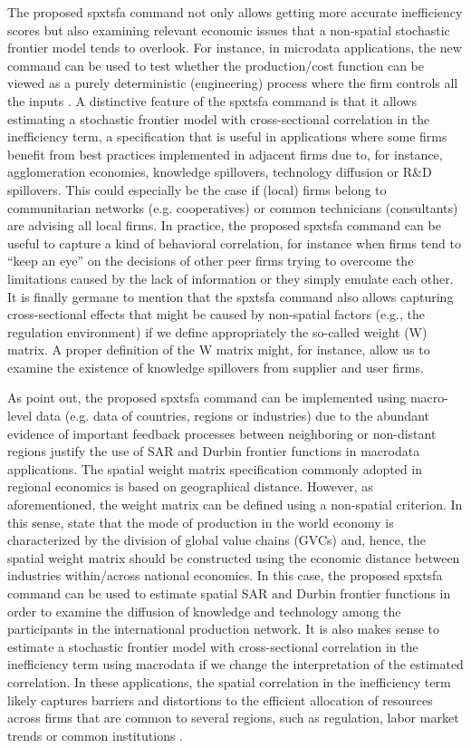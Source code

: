 The proposed spxtsfa command not only allows getting more accurate inefficiency scores \citep[see e.g.][]{orea2018spatial} but also examining relevant economic issues that a non-spatial stochastic frontier model tends to overlook. For instance, in microdata applications, the new command can be used to test whether the production/cost function can be viewed as a purely deterministic (engineering) process where the firm controls all the inputs \citep[see e.g.][]{druska2004generalized}. A distinctive feature of the spxtsfa command is that it allows estimating a stochastic frontier model with cross-sectional correlation in the inefficiency term, a specification that is useful in applications where some firms benefit from best practices implemented in adjacent firms due to, for instance, agglomeration economies, knowledge spillovers, technology diffusion or R\&D spillovers. This could especially be the case if (local) firms belong to communitarian networks (e.g. cooperatives) or common technicians (consultants) are advising all local firms. In practice, the proposed spxtsfa command can be useful to capture a kind of behavioral correlation, for instance when firms tend to “keep an eye” on the decisions of other peer firms trying to overcome the limitations caused by the lack of information or they simply emulate each other. It is finally germane to mention that the spxtsfa command also allows capturing cross-sectional effects that might be caused by non-spatial factors (e.g., the regulation environment) if we define appropriately the so-called weight (W) matrix. A proper definition of the W matrix might, for instance, allow us to examine the existence of knowledge spillovers from supplier and user firms. 

As \cite{orea2019new} point out, the proposed spxtsfa command can be implemented using macro-level data (e.g. data of countries, regions or industries) due to the abundant evidence of important feedback processes between neighboring or non-distant regions justify the use of SAR and Durbin frontier functions in macrodata applications. The spatial weight matrix specification commonly adopted in regional economics is based on geographical distance. However, as aforementioned, the weight matrix can be defined using a non-spatial criterion.  In this sense, \cite{liu2023industry} state that the mode of production in the world economy is characterized by the division of global value chains (GVCs) and, hence, the spatial weight matrix should be constructed using the economic distance between industries within/across national economies. In this case, the proposed spxtsfa command can be used to estimate spatial SAR and Durbin frontier functions in order to examine the diffusion of knowledge and technology among the participants in the international production network. It is also makes sense to estimate a stochastic frontier model with cross-sectional correlation in the inefficiency term using macrodata if we change the interpretation of the estimated correlation. In these applications, the spatial correlation in the inefficiency term likely captures barriers and distortions to the efficient allocation of resources across firms that are common to several regions, such as regulation, labor market trends or common institutions \citep[see e.g.][]{orea2023industry}.  


